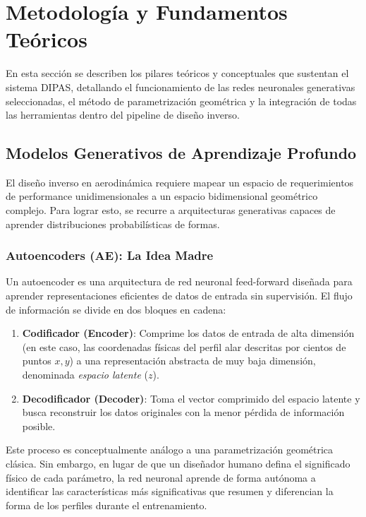 \section{Metodología y Fundamentos Teóricos}
\label{sec:metodologia}

En esta sección se describen los pilares teóricos y conceptuales que sustentan el sistema DIPAS, detallando el funcionamiento de las redes neuronales generativas seleccionadas, el método de parametrización geométrica y la integración de todas las herramientas dentro del pipeline de diseño inverso.

\subsection{Modelos Generativos de Aprendizaje Profundo}
El diseño inverso en aerodinámica requiere mapear un espacio de requerimientos de performance unidimensionales a un espacio bidimensional geométrico complejo. Para lograr esto, se recurre a arquitecturas generativas capaces de aprender distribuciones probabilísticas de formas.

\subsubsection{Autoencoders (AE): La Idea Madre}
Un autoencoder es una arquitectura de red neuronal feed-forward diseñada para aprender representaciones eficientes de datos de entrada sin supervisión. El flujo de información se divide en dos bloques en cadena:
\begin{enumerate}
    \item \textbf{Codificador (Encoder)}: Comprime los datos de entrada de alta dimensión (en este caso, las coordenadas físicas del perfil alar descritas por cientos de puntos $x,y$) a una representación abstracta de muy baja dimensión, denominada \textit{espacio latente} ($z$).
    \item \textbf{Decodificador (Decoder)}: Toma el vector comprimido del espacio latente y busca reconstruir los datos originales con la menor pérdida de información posible.
\end{enumerate}
Este proceso es conceptualmente análogo a una parametrización geométrica clásica. Sin embargo, en lugar de que un diseñador humano defina el significado físico de cada parámetro, la red neuronal aprende de forma autónoma a identificar las características más significativas que resumen y diferencian la forma de los perfiles durante el entrenamiento.

